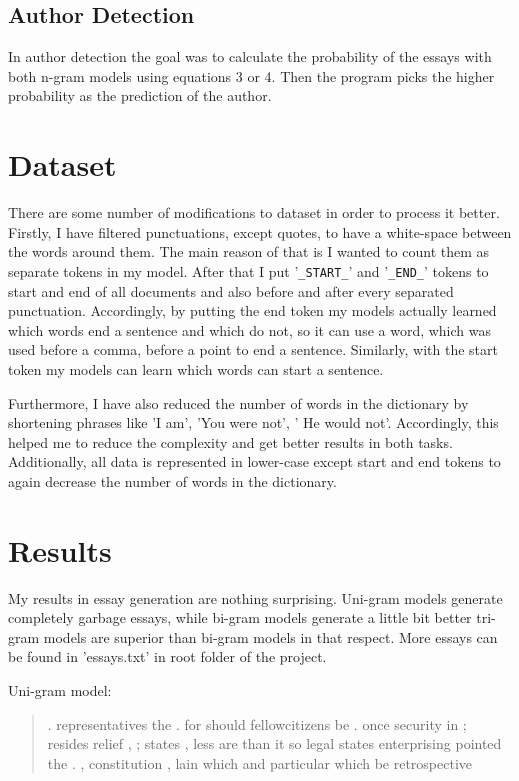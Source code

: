 \documentclass{article}
\begin{document}
\subsection{Author Detection}

In author detection the goal was to calculate the probability of the essays with both n-gram models using equations 3 or 4. Then the program picks the higher probability as the prediction of the author.
\section{Dataset}

There are some number of modifications to dataset in order to process it better. Firstly, I have filtered punctuations, except quotes, to have a white-space between the words around them. The main reason of that is I wanted to count them as separate tokens in my model. After that I put '\texttt{\_START\_}' and '\texttt{\_END\_}' tokens to start and end of all documents and also before and after every separated punctuation. Accordingly, by putting the end token my models actually learned which words end a sentence and which do not, so it can use a word, which was used before a comma, before a point to end a sentence. Similarly, with the start token my models can learn which words can start a sentence.

Furthermore, I have also reduced the number of words in the dictionary by shortening phrases like 'I am', 'You were not', ' He would not'. Accordingly, this helped me to reduce the complexity and get better results in both tasks. Additionally, all data is represented in lower-case except start and end tokens to again decrease the number of words in the dictionary.

\section{Results}
My results in essay generation are nothing surprising. Uni-gram models generate completely garbage essays, while bi-gram models generate a little bit better tri-gram models are superior than bi-gram models in that respect. More essays can be found in 'essays.txt' in root folder of the project.

Uni-gram model:
\begin{quote}
. representatives the . for should fellowcitizens be . once security in ; resides relief , ; states , less are than it so legal states enterprising pointed the . , constitution , lain which and particular which be retrospective
\end{quote}
\end{document}
